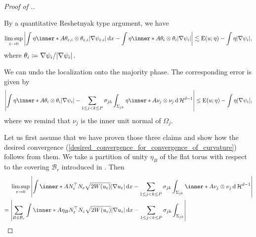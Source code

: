 \begin{proof}[Proof of .]
\begin{description}[wide=0pt]
		\item[Claim 2:]
		By a quantitative Reshetnyak type argument, we have
		\begin{equation*}
			\limsup_{ \varepsilon \to 0 }
			\abs{
				\int
				\eta \inner*{ A }{ \theta_{ \varepsilon, i } \otimes \theta_{ 
						\varepsilon,  i } }
				\abs{ \nabla \psi_{ \varepsilon,  i } }
				\dd{ x }
				-
				\int
				\eta \inner*{ A }{ \theta_{ i }  \otimes 
					\theta_{ i } }
				\abs{ \nabla \psi_{ i } }
			}
			\lesssim
			\energy ( u ; \eta ) - \int \eta \abs{ \nabla \psi_{ i } },
		\end{equation*}
		where $ \theta_{ i } \coloneqq \nabla \psi_{ i } / \abs{ \nabla \psi_{ 
				i } } $.
		\item[Claim 3:] 
		We can undo the localization onto the majority phase. The corresponding 
		error is given by
		\begin{equation*}
			\abs{ 
				\int
				\eta
				\inner*{ A }{ \theta_{ i } \otimes \theta_{ i } }
				\abs{ \nabla \psi_{ i } }
				-
				\sum_{ 1 \leq j < k \leq P }
				\sigma_{ j k }
				\int_{ \Sigma_{ j k } }
				\eta 
				\inner*{ A }{ \nu_{ j } \otimes \nu_{ j } }
				\dd{ \hm^{ d - 1 } }
			}
			\leq
			\energy ( u ; \eta ) - \int \eta \abs{ \nabla \psi_{ i } },
		\end{equation*}
		where we remind that $ \nu_{ j } $ is the inner unit normal of $ 
		\Omega_{ j } $.
	\end{description}
	Let us first assume that we have proven those three claims and show how the 
	desired convergence 
	(\ref{desired_convergence_for_convergence_of_curvature}) follows from them. 
	We take a partition of unity $ \eta_{ B } $ of the flat torus with respect 
	to the covering $ \mathcal{ B }_{ r } $ introduced in 
	. Then
	\begin{align*}
		& \limsup_{ \varepsilon \to 0 }
		\abs{
			\int
			\inner*{ A }{ N_{ \varepsilon }^{ \top } N_{ \varepsilon } }
			\sqrt{ 2 W ( u_{ \varepsilon } ) }
			\abs{ \nabla u_{ \varepsilon } }
			\dd{ x }
			-
			\sum_{ 1 \leq j < k \leq P }
			\sigma_{ j  k }
			\int_{ \Sigma_{ j k } }
			\inner*{ A }{ \nu_{ j } \otimes \nu_{ j } }
			\dd{ \hm^{ d - 1 } }
		} 
		\\
		={} &
		\abs{ 
			\sum_{ B \in \mathcal{ B }_{ r } }
			\int
			\inner*{ A \eta_{ B } }
			{ N_{ \varepsilon }^{ \top } N_{ \varepsilon } }
			\sqrt{ 2 W ( u_{ \varepsilon } ) } \abs{ \nabla u_{ \varepsilon } }
			\dd{ x }
			-
			\sum_{ 1 \leq j < k \leq P }
			\sigma_{ j k }
			\int_{ \Sigma_{ j k } }
}
\end{align*}
\end{proof}
